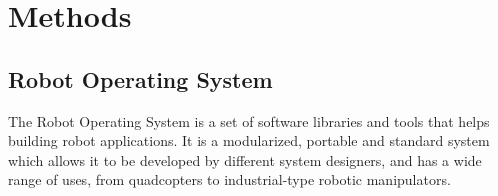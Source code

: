 \section{Methods}
\label{sec:Methods}


\subsection{Robot Operating System}
\label{subsec:ROS}

The Robot Operating System is a set of software libraries and tools that helps building robot applications. It is a modularized, portable and standard system which allows it to be developed by different system designers, and has a wide range of uses, from quadcopters to industrial-type robotic manipulators. 

